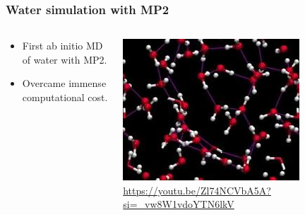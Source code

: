 \begin{frame}
    \frametitle{Water simulation with MP2}
     \begin{columns}[T]
        \begin{column}{0.5\textwidth}
            \vspace{2cm}
            \begin{itemize}
                \item First ab initio MD of water with MP2.
                \item Overcame immense computational cost.
            \end{itemize}
        \end{column}
        \begin{column}{0.5\textwidth}
            \includegraphics[width=\textwidth]{images/waterMP21.jpg}
            \tiny{\url{https://youtu.be/Zl74NCVbA5A?si=_vw8W1vdoYTN6lkV}}
        \end{column}
    \end{columns}
\end{frame}

